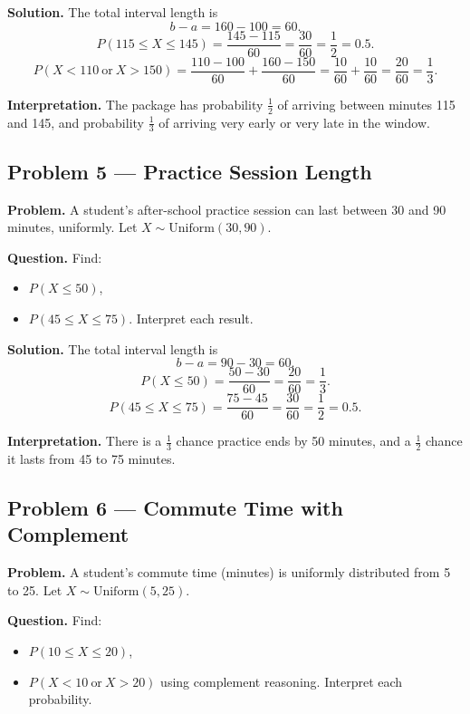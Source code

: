 \begin{ExamProblems}
\textbf{Solution.}
The total interval length is
\[
b-a=160-100=60.
\]
\[
P(115\le X\le 145)=\frac{145-115}{60}=\frac{30}{60}=\frac{1}{2}=0.5.
\]
\[
P(X<110\ \text{or}\ X>150)=\frac{110-100}{60}+\frac{160-150}{60}=\frac{10}{60}+\frac{10}{60}=\frac{20}{60}=\frac{1}{3}.
\]

\textbf{Interpretation.}
The package has probability $\frac{1}{2}$ of arriving between minutes 115 and 145, and probability $\frac{1}{3}$ of arriving very early or very late in the window.


\item
\subsection*{Problem 5 — Practice Session Length}

\textbf{Problem.}
A student's after-school practice session can last between 30 and 90 minutes, uniformly.
Let $X\sim \text{Uniform}(30,90)$.

\textbf{Question.}
Find:
\begin{itemize}
    \item[(a)] $P(X\le 50)$,
    \item[(b)] $P(45\le X\le 75)$.
Interpret each result.
\end{itemize}

\textbf{Solution.}
The total interval length is
\[
b-a=90-30=60.
\]
\[
P(X\le 50)=\frac{50-30}{60}=\frac{20}{60}=\frac{1}{3}.
\]
\[
P(45\le X\le 75)=\frac{75-45}{60}=\frac{30}{60}=\frac{1}{2}=0.5.
\]

\textbf{Interpretation.}
There is a $\frac{1}{3}$ chance practice ends by 50 minutes, and a $\frac{1}{2}$ chance it lasts from 45 to 75 minutes.


\item
\subsection*{Problem 6 — Commute Time with Complement}

\textbf{Problem.}
A student's commute time (minutes) is uniformly distributed from 5 to 25.
Let $X\sim \text{Uniform}(5,25)$.

\textbf{Question.}
Find:
\begin{itemize}
    \item[(a)] $P(10\le X\le 20)$,
    \item[(b)] $P(X<10\ \text{or}\ X>20)$ using complement reasoning.
Interpret each probability.
\end{itemize}


\end{ExamProblems}
